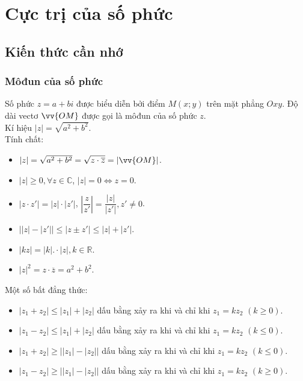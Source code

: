 \setcounter{section}{41}
\setcounter{ex}{0}
\section{Cực trị của số phức}
\subsection{Kiến thức cần nhớ}
\begin{khung}
	\subsubsection{Môđun của số phức}
	Số phức $ z=a+bi $ được biểu diễn bởi điểm $ M(x;y) $ trên mặt phẳng $ Oxy $. Độ dài vectơ $ \vv{OM} $ được gọi là môđun của số phức $ z $.\\
	Kí hiệu $ |z|=\sqrt{a^2+b^2} $.\\
	Tính chất:
	\begin{itemize}
		\item $ |z|=\sqrt{a^2+b^2}=\sqrt{z\cdot \overline{z}}=|\vv{OM}| $.
		\item $ |z|\ge 0,\forall z\in\mathbb{C} $, $ |z|=0\Leftrightarrow z=0 $.
		\item $ |z\cdot z'|=|z|\cdot |z'| $, $ \left|\dfrac{z}{z'}\right|=\dfrac{|z|}{|z'|}, z'\ne 0 $.
		\item $ \left||z|-|z'|\right|\le |z\pm z'|\le |z|+|z'| $.
		\item $ |kz|=|k|.\cdot|z|, k\in\mathbb{R} $.
		\item $ |z|^2=z\cdot \overline{z}=a^2+b^2 $.
	\end{itemize}
	Một số bất đẳng thức:
	\begin{itemize}
		\item $ |z_1+z_2|\le |z_1|+|z_2| $ dấu bằng xảy ra khi và chỉ khi $ z_1=kz_2 $ $ (k\ge 0) $.
		\item $ |z_1-z_2|\le |z_1|+|z_2| $ dấu bằng xảy ra khi và chỉ khi $ z_1=kz_2 $ $ (k\le 0) $.
		\item $ |z_1+z_2|\ge \left||z_1|-|z_2|\right| $ dấu bằng xảy ra khi và chỉ khi $ z_1=kz_2 $ $ (k\le 0) $.
		\item $ |z_1-z_2|\ge \left||z_1|-|z_2|\right| $ dấu bằng xảy ra khi và chỉ khi $ z_1=kz_2 $ $ (k\ge 0) $.
	\end{itemize}
	
\end{khung}

